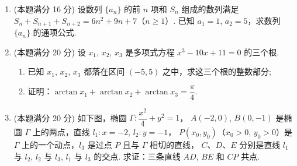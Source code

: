 \documentclass{chsmc}
\begin{document}
\begin{enumerate}[resume]
	\item (本题满分 16 分) 设数列 $\{a_n\}$ 的前 $n$ 项和 $S_n$ 组成的数列满足
		$S_n + S_{n+1} + S_{n+2} = 6n^2 + 9n + 7$（$n \geqslant 1$）.
		已知 $a_1 = 1$, $a_2 = 5$，求数列 $\{a_n\}$ 的通项公式.
	\item (本题满分 20 分) 设 $x_1$, $x_2$, $x_3$ 是多项式方程 $x^3 - 10x + 11 = 0$ 的三个根.
		\begin{enumerate}[(1)]
			\item 已知 $x_1$, $x_2$, $x_3$ 都落在区间 $(-5,5)$ 之中，求这三个根的整数部分;
			\item 证明：$\arctan x_1 + \arctan x_2 + \arctan x_3 = \dfrac{\pi}{4}$.
		\end{enumerate}
	\item (本题满分 20 分) 如下图，椭圆 $\Gamma\colon \dfrac{x^2}{4} + y^2 = 1$，
		$A(-2,0)$, $B(0,-1)$ 是椭圆 $\Gamma$ 上的两点，直线 $l_1\colon x = -2$, $l_2\colon y = -1$，
		$P(x_0,y_0)$（$x_0 > 0$, $y_0 > 0$）是 $\Gamma$ 上的一个动点，$l_3$ 是过点 $P$ 且与 $\Gamma$ 相切的直线，
		$C$、$D$、$E$ 分别是直线 $l_1$ 与 $l_2$, $l_2$ 与 $l_3$, $l_1$ 与 $l_3$ 的交点.
		求证：三条直线 $AD$, $BE$ 和 $CP$ 共点.
\end{enumerate}
\end{document}
